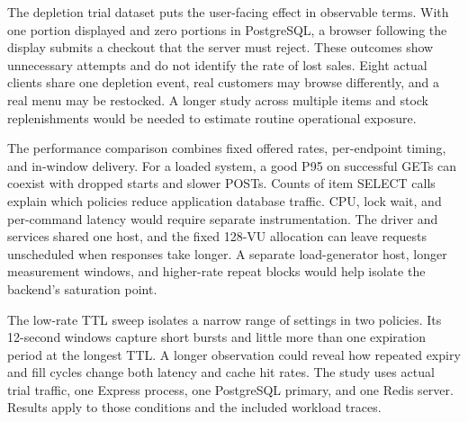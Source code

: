 The depletion trial dataset puts the user-facing effect in observable terms. With one portion displayed and zero portions in PostgreSQL, a browser following the display submits a checkout that the server must reject. These outcomes show unnecessary attempts and do not identify the rate of lost sales. Eight actual clients share one depletion event, real customers may browse differently, and a real menu may be restocked. A longer study across multiple items and stock replenishments would be needed to estimate routine operational exposure.

The performance comparison combines fixed offered rates, per-endpoint timing, and in-window delivery. For a loaded system, a good P95 on successful GETs can coexist with dropped starts and slower POSTs. Counts of item SELECT calls explain which policies reduce application database traffic. CPU, lock wait, and per-command latency would require separate instrumentation. The driver and services shared one host, and the fixed 128-VU allocation can leave requests unscheduled when responses take longer. A separate load-generator host, longer measurement windows, and higher-rate repeat blocks would help isolate the backend's saturation point.

The low-rate TTL sweep isolates a narrow range of settings in two policies. Its 12-second windows capture short bursts and little more than one expiration period at the longest TTL. A longer observation could reveal how repeated expiry and fill cycles change both latency and cache hit rates. The study uses actual trial traffic, one Express process, one PostgreSQL primary, and one Redis server. Results apply to those conditions and the included workload traces.
